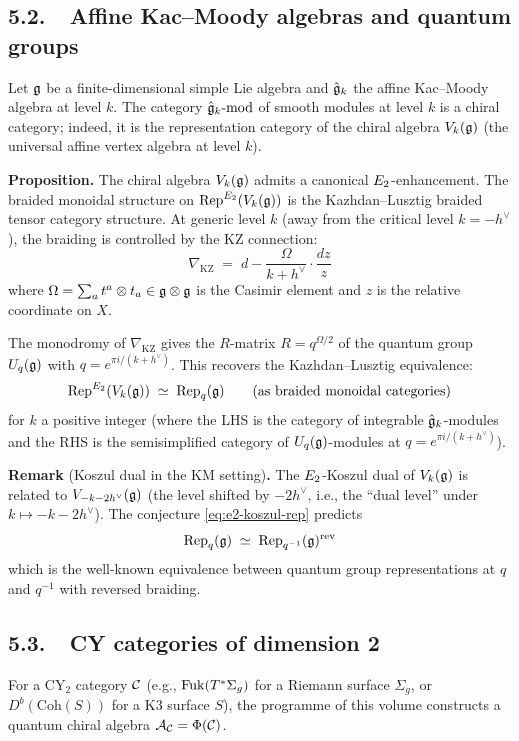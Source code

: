 \subsection*{5.2.\ \ Affine Kac--Moody algebras and quantum groups}

Let $\mathfrak{g}$ be a finite-dimensional simple Lie algebra and $\hat{\mathfrak{g}}_k$
the affine Kac--Moody algebra at level $k$. The category
$\hat{\mathfrak{g}}_k\text{-mod}$ of smooth modules at level $k$ is a chiral
category; indeed, it is the representation category of the chiral
algebra $V_k(\mathfrak{g})$ (the universal affine vertex algebra at level $k$).

\medskip
\noindent\textbf{Proposition}\textbf{.}\;
The chiral algebra $V_k(\mathfrak{g})$ admits a canonical $E_2$-enhancement.
The braided monoidal structure on $\mathrm{Rep}^{E_2}(V_k(\mathfrak{g}))$ is the
Kazhdan--Lusztig braided tensor category structure. At generic level
$k$ (away from the critical level $k = -h^\vee$), the braiding is
controlled by the KZ connection:
\[
 \nabla_{\mathrm{KZ}}
 \;=\;
 d - \frac{\Omega}{k + h^\vee} \cdot \frac{dz}{z}
\]
where $\Omega = \sum_a t^a \otimes t_a \in \mathfrak{g} \otimes \mathfrak{g}$ is the
Casimir element and $z$ is the relative coordinate on $X$.

The monodromy of $\nabla_{\mathrm{KZ}}$ gives the $R$-matrix
$R = q^{\Omega/2}$ of the quantum group $U_q(\mathfrak{g})$ with
$q = e^{\pi i/(k + h^\vee)}$. This recovers the
Kazhdan--Lusztig equivalence:
\[
 \mathrm{Rep}^{E_2}(V_k(\mathfrak{g}))
 \;\simeq\;
 \mathrm{Rep}_q(\mathfrak{g})
 \qquad\text{(as braided monoidal categories)}
\]
for $k$ a positive integer (where the LHS is the category of
integrable $\hat{\mathfrak{g}}_k$-modules and the RHS is the semisimplified
category of $U_q(\mathfrak{g})$-modules at $q = e^{\pi i/(k+h^\vee)}$).

\medskip
\noindent\textbf{Remark} (Koszul dual in the KM setting)\textbf{.}
The $E_2$-Koszul dual of $V_k(\mathfrak{g})$ is related to
$V_{-k-2h^\vee}(\mathfrak{g})$ (the level shifted by $-2h^\vee$, i.e., the
``dual level'' under $k \mapsto -k - 2h^\vee$). The conjecture
\eqref{eq:e2-koszul-rep} predicts
\[
 \mathrm{Rep}_q(\mathfrak{g})
 \;\simeq\;
 \mathrm{Rep}_{q^{-1}}(\mathfrak{g})^{\mathrm{rev}}
\]
which is the well-known equivalence between quantum group representations
at $q$ and $q^{-1}$ with reversed braiding.

\subsection*{5.3.\ \ CY categories of dimension 2}

For a CY$_2$ category $\mathcal{C}$ (e.g., $\mathrm{Fuk}(T^*\Sigma_g)$ for a
Riemann surface $\Sigma_g$, or $D^b(\mathrm{Coh}(S))$ for a K3
surface $S$), the programme of this volume constructs a quantum chiral
algebra $\mathcal{A}_{\mathcal{C}} = \Phi(\mathcal{C})$.

